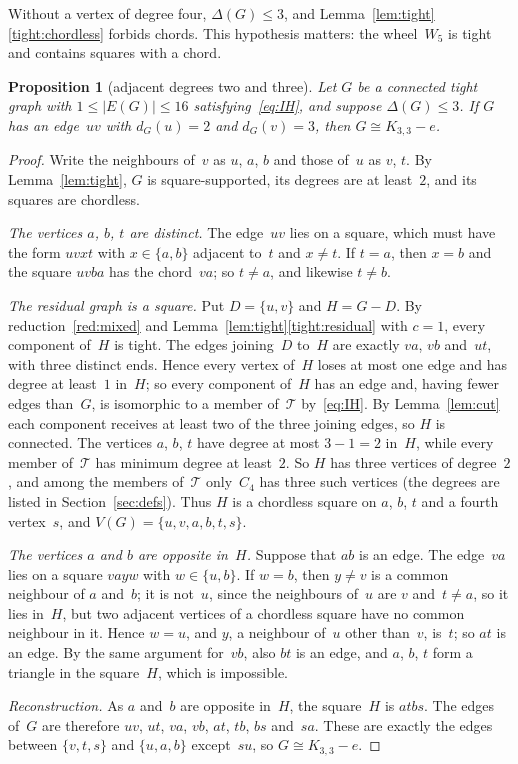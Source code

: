 \documentclass[11pt,letterpaper]{article}
\numberwithin{equation}{section}
\theoremstyle{plain}
\newtheorem{proposition}[theorem]{Proposition}
\theoremstyle{definition}
\theoremstyle{remark}
\newcommand{\Kme}{K_{3,3}-e}
\newcommand{\Tfam}{\mathcal{T}}
\begin{document}
Without a vertex of degree four, $\Delta(G)\le3$, and Lemma~\ref{lem:tight}\ref{tight:chordless} forbids chords. This hypothesis matters: the wheel~$W_5$ is tight and contains squares with a chord.

\begin{proposition}[adjacent degrees two and three]\label{prop:mixed}
Let $G$ be a connected tight graph with $1\le|E(G)|\le16$ satisfying~\eqref{eq:IH}, and suppose $\Delta(G)\le3$. If $G$ has an edge~$uv$ with $d_G(u)=2$ and $d_G(v)=3$, then $G\cong\Kme$.
\end{proposition}

\begin{proof}
Write the neighbours of~$v$ as $u$, $a$, $b$ and those of~$u$ as $v$, $t$. By Lemma~\ref{lem:tight}, $G$ is square-supported, its degrees are at least~$2$, and its squares are chordless.

\emph{The vertices $a$, $b$, $t$ are distinct.} The edge~$uv$ lies on a square, which must have the form $uvxt$ with $x\in\{a,b\}$ adjacent to~$t$ and $x\ne t$. If $t=a$, then $x=b$ and the square $uvba$ has the chord~$va$; so $t\ne a$, and likewise $t\ne b$.

\emph{The residual graph is a square.} Put $D=\{u,v\}$ and $H=G-D$. By reduction~\ref{red:mixed} and Lemma~\ref{lem:tight}\ref{tight:residual} with $c=1$, every component of~$H$ is tight. The edges joining~$D$ to~$H$ are exactly $va$, $vb$ and~$ut$, with three distinct ends. Hence every vertex of~$H$ loses at most one edge and has degree at least~$1$ in~$H$; so every component of~$H$ has an edge and, having fewer edges than~$G$, is isomorphic to a member of~$\Tfam$ by~\eqref{eq:IH}. By Lemma~\ref{lem:cut} each component receives at least two of the three joining edges, so $H$ is connected. The vertices $a$, $b$, $t$ have degree at most $3-1=2$ in~$H$, while every member of~$\Tfam$ has minimum degree at least~$2$. So $H$ has three vertices of degree~$2$, and among the members of~$\Tfam$ only~$C_4$ has three such vertices (the degrees are listed in Section~\ref{sec:defs}). Thus $H$ is a chordless square on $a$, $b$, $t$ and a fourth vertex~$s$, and $V(G)=\{u,v,a,b,t,s\}$.

\emph{The vertices $a$ and $b$ are opposite in~$H$.} Suppose that $ab$ is an edge. The edge~$va$ lies on a square $vayw$ with $w\in\{u,b\}$. If $w=b$, then $y\ne v$ is a common neighbour of $a$ and~$b$; it is not~$u$, since the neighbours of~$u$ are $v$ and~$t\ne a$, so it lies in~$H$, but two adjacent vertices of a chordless square have no common neighbour in it. Hence $w=u$, and $y$, a neighbour of~$u$ other than~$v$, is~$t$; so $at$ is an edge. By the same argument for~$vb$, also $bt$ is an edge, and $a$, $b$, $t$ form a triangle in the square~$H$, which is impossible.

\emph{Reconstruction.} As $a$ and~$b$ are opposite in~$H$, the square~$H$ is $atbs$. The edges of~$G$ are therefore $uv$, $ut$, $va$, $vb$, $at$, $tb$, $bs$ and~$sa$. These are exactly the edges between $\{v,t,s\}$ and $\{u,a,b\}$ except~$su$, so $G\cong\Kme$.
\end{proof}
\end{document}
